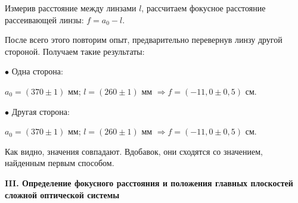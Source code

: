 \documentclass[a4paper,12pt]{article} %
\begin{document}
\begin{enumerate}
	Измерив расстояние между линзами $l$, рассчитаем фокусное расстояние рассеивающей линзы: $f = a_0 - l$.
	
	После всего этого повторим опыт, предварительно перевернув линзу другой стороной. Получаем такие результаты:
	
	$\bullet$ Одна сторона: 
	
	$a_0 = (370 \pm 1)$ мм; $l = (260 \pm 1)$ мм $\Longrightarrow f = (-11,0 \pm 0,5)$ см.
	
	$\bullet$ Другая сторона:
	
	$a_0 = (370 \pm 1)$ мм; $l = (260 \pm 1)$ мм $\Longrightarrow f = (-11,0 \pm 0,5)$ см.
	

	\vspace{5mm}	
	Как видно, значения совпадают. Вдобавок, они сходятся со значением, найденным первым способом.
	\end{enumerate}

	\newpage
	\begin{center}
		\textbf{III. Определение фокусного расстояния и положения главных плоскостей сложной оптической системы}
	\end{center}
\end{document}
